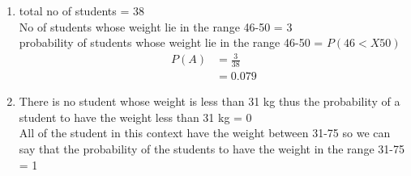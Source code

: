 \renewcommand{\theequation}{\theenumi}
\begin{enumerate}[label=\arabic*.,ref=\thesubsection.\theenumi]
\item total no of students = 38
\\
No of students whose weight lie in the range 46-50 = 3\\

probability  of students whose weight lie in the range 46-50 = $P(46<X50)$
\\
\begin{align}
P\left(A\right) &= \frac{3}{38}
\\
&= 0.079
\end{align}
\item
There is no student whose weight is less than 31 kg thus the probability of a student to have the weight less than 31 kg = 0\\

All of the student in this context  have the weight between 31-75 so we can say that the probability of the students to have the weight in the range 31-75 = 1
\end{enumerate}